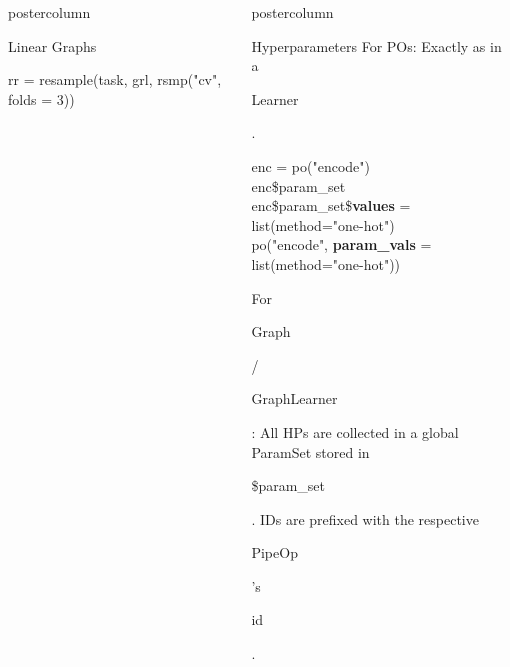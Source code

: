 \documentclass{beamer}
\newlength{\columnheight} %
\newcommand{\codeinline}[1]{\begin{codeboxinline}#1\end{codeboxinline}}
\begin{document}
\begin{frame}[fragile]{}
\begin{columns}
\begin{column}{.245\textwidth}
\begin{beamercolorbox}[center]{postercolumn}
\begin{minipage}{.98\textwidth}
{\begin{myblock}{Linear Graphs}
\begin{codeboxexample}
{                rr = resample(task, grl, rsmp("cv", folds = 3))
                }
              \end{codeboxexample}
            \end{myblock}
            \vfill}
        \end{minipage}
      \end{beamercolorbox}
    \end{column}
    \begin{column}{.245\textwidth}
      \begin{beamercolorbox}[center]{postercolumn}
        \begin{minipage}{.98\textwidth}
          \parbox[t][\columnheight]{\textwidth}{
            \begin{myblock}{Hyperparameters}
              For POs: Exactly as in a \codeinline{Learner}.
              \\
              \begin{codeboxmultiline}[width=26cm]
                {\footnotesize enc = po("encode") \\
                  enc\$param\_set\\
                  enc\$param\_set\$\textbf{values} = list(method="one-hot") \\
                  po("encode", \textbf{param\_vals} = list(method="one-hot"))}
              \end{codeboxmultiline}
              \vspace{1.0em}
              For \codeinline{Graph} / \codeinline{GraphLearner}: All HPs are collected in a global ParamSet stored in \codeinline{\$param\_set}.
              IDs are prefixed with the respective \codeinline{PipeOp}'s \codeinline{id}.

\end{myblock}}
\end{minipage}
\end{beamercolorbox}
\end{column}
\end{columns}
\end{frame}
\end{document}
